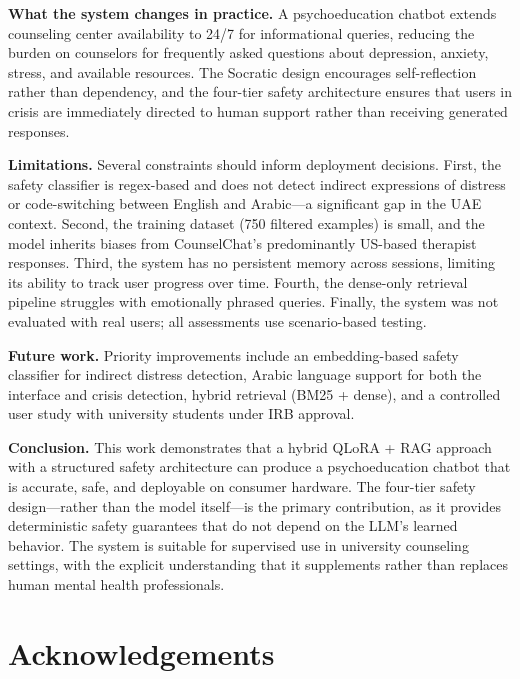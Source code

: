 \documentclass[conference]{IEEEtran}
\begin{document}
\textbf{What the system changes in practice.} A psychoeducation chatbot extends counseling center availability to 24/7 for informational queries, reducing the burden on counselors for frequently asked questions about depression, anxiety, stress, and available resources. The Socratic design encourages self-reflection rather than dependency, and the four-tier safety architecture ensures that users in crisis are immediately directed to human support rather than receiving generated responses.

\textbf{Limitations.} Several constraints should inform deployment decisions. First, the safety classifier is regex-based and does not detect indirect expressions of distress or code-switching between English and Arabic---a significant gap in the UAE context. Second, the training dataset (750 filtered examples) is small, and the model inherits biases from CounselChat's predominantly US-based therapist responses. Third, the system has no persistent memory across sessions, limiting its ability to track user progress over time. Fourth, the dense-only retrieval pipeline struggles with emotionally phrased queries. Finally, the system was not evaluated with real users; all assessments use scenario-based testing.

\textbf{Future work.} Priority improvements include an embedding-based safety classifier for indirect distress detection, Arabic language support for both the interface and crisis detection, hybrid retrieval (BM25 + dense), and a controlled user study with university students under IRB approval.

\textbf{Conclusion.} This work demonstrates that a hybrid QLoRA + RAG approach with a structured safety architecture can produce a psychoeducation chatbot that is accurate, safe, and deployable on consumer hardware. The four-tier safety design---rather than the model itself---is the primary contribution, as it provides deterministic safety guarantees that do not depend on the LLM's learned behavior. The system is suitable for supervised use in university counseling settings, with the explicit understanding that it supplements rather than replaces human mental health professionals.

\section*{Acknowledgements}
\end{document}
